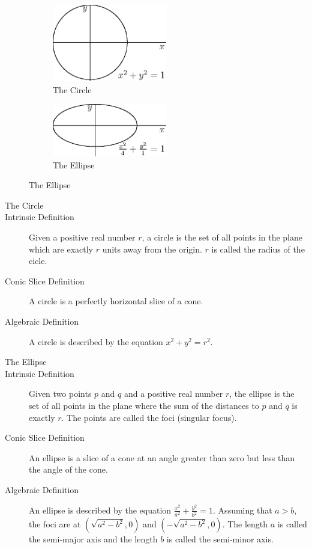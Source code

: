 \documentclass[fleqn]{report}
\begin{document}
\begin{figure}[t]
\centering
\begin{subfigure}{.5\textwidth}
 \centering
 \includegraphics[width=5cm]{figure03.eps}
 \caption{The Circle}
\end{subfigure}%
\begin{subfigure}{.5\textwidth}
 \centering
 \includegraphics[width=5cm]{figure06.eps}
 \caption{The Ellipse}
\end{subfigure}
\label{figure-conics1}
\end{figure}

\begin{description}
\item[The Circle]
\item[Intrinsic Definition] Given a positive real number $r$,
a circle is the set of all points in the plane which are
exactly $r$ units away from the origin. $r$ is called the
radius of the cicle.
\item[Conic Slice Definition] A circle is a perfectly
horizontal slice of a cone.
\item[Algebraic Definition] A circle is described by the
equation $x^2 + y^2 = r^2$.
\end{description}

\begin{description}
\item[The Ellipse]
\item[Intrinsic Definition] Given two points $p$ and $q$ and a
positive real number $r$, the ellipse is the set of all points
in the plane where the sum of the distances to $p$ and $q$ is
exactly $r$. The points are called the foci (singular focus). 
\item[Conic Slice Definition] An ellipse is a slice of a cone
at an angle greater than zero but less than the angle of the
cone.
\item[Algebraic Definition] An ellipse is described by the
equation $\frac{x^2}{a^2} + \frac{y^2}{b^2} = 1$. Assuming
that $a>b$, the foci are at $(\sqrt{a^2-b^2},0)$ and
$(-\sqrt{a^2-b^2},0)$. The length $a$ is called the semi-major
axis and the length $b$ is called the semi-minor axis.
\end{description}
\end{document}
